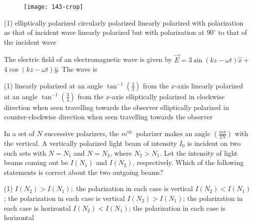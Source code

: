 \begin{enumerate}
\begin{minipage}{\textwidth}
	\begin{figure}[H]
		\centering
		\texttt{[image: 143-crop]}
	\end{figure}
\end{minipage}
\begin{tasks}(1)
	\task[\textbf{A.}] elliptically polarized
	\task[\textbf{B.}]circularly polarized
	\task[\textbf{C.}]linearly polarized with polarization as that of incident wave
	\task[\textbf{D.}]linearly polarized but with polarization at $90^{\circ}$ to that of the incident wave
\end{tasks}
\begin{minipage}{\textwidth}
	\item The electric field of an electromagnetic wave is given by $\vec{E}=3 \sin (k z-\omega t) \hat{x}+$ $4 \cos (k z-\omega t) \hat{y}$. The wave is
\end{minipage}
\begin{tasks}(1)
	\task[\textbf{A.}] linearly polarized at an angle $\tan ^{-1}\left(\frac{4}{3}\right)$ from the $x$-axis
	\task[\textbf{B.}]linearly polarized at an angle $\tan ^{-1}\left(\frac{3}{4}\right)$ from the $x$-axis
	\task[\textbf{C.}] elliptically polarized in clockwise direction when seen travelling towards the observer
	\task[\textbf{D.}] elliptically polarized in counter-clockwise direction when seen travelling towards the observer
\end{tasks}
\begin{minipage}{\textwidth}
	\item In a set of $N$ successive polarizers, the $m^{\text {th }}$ polarizer makes an angle $\left(\frac{m \pi}{2 N}\right)$ with the vertical. A vertically polarized light beam of intensity $I_{0}$ is incident on two such sets with $N=N_{1}$ and $N=N_{2}$, where $N_{2}>N_{1} .$ Let the intensity of light beams coming out be $I\left(N_{1}\right)$ and $I\left(N_{2}\right)$, respectively. Which of the following statements is correct about the two outgoing beams?
\end{minipage}
\begin{tasks}(1)
	\task[\textbf{A.}] $I\left(N_{2}\right)>I\left(N_{1}\right) ;$ the polarization in each case is vertical
	\task[\textbf{B.}]$I\left(N_{2}\right)<I\left(N_{1}\right)$; the polarization in each case is vertical
	\task[\textbf{C.}]$I\left(N_{2}\right)>I\left(N_{1}\right)$; the polarization in each case is horizontal
	\task[\textbf{D.}]$I\left(N_{2}\right)<I\left(N_{1}\right)$; the polarization in each case is horizontal

\end{tasks}
\end{enumerate}
